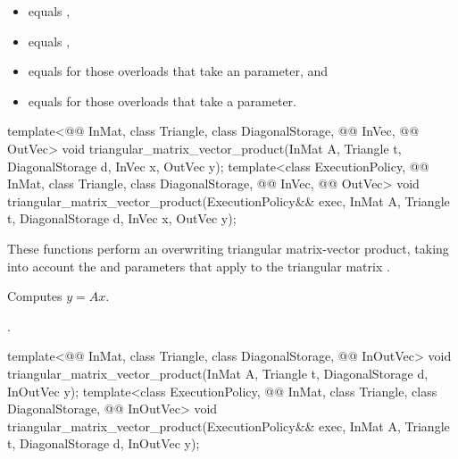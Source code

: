 \pnum
\expects
\begin{itemize}
\item
{} equals ,
\item
{} equals ,
\item
{} equals  for those overloads that take an  parameter, and
\item
{} equals  for those overloads that take a  parameter.
\end{itemize}

%
\begin{itemdecl}
template<@@ InMat, class Triangle, class DiagonalStorage, @@ InVec,
         @@ OutVec>
  void triangular_matrix_vector_product(InMat A, Triangle t, DiagonalStorage d, InVec x, OutVec y);
template<class ExecutionPolicy,
         @@ InMat, class Triangle, class DiagonalStorage, @@ InVec,
         @@ OutVec>
  void triangular_matrix_vector_product(ExecutionPolicy&& exec,
                                        InMat A, Triangle t, DiagonalStorage d, InVec x, OutVec y);
\end{itemdecl}

\begin{itemdescr}

\pnum
These functions perform
an overwriting triangular matrix-vector product,
taking into account the  and  parameters
that apply to the triangular matrix .

\pnum
\effects
Computes $y = A x$.

\pnum
\complexity
{}.
\end{itemdescr}

%
\begin{itemdecl}
template<@@ InMat, class Triangle, class DiagonalStorage, @@ InOutVec>
  void triangular_matrix_vector_product(InMat A, Triangle t, DiagonalStorage d, InOutVec y);
template<class ExecutionPolicy,
         @@ InMat, class Triangle, class DiagonalStorage, @@ InOutVec>
  void triangular_matrix_vector_product(ExecutionPolicy&& exec,
                                        InMat A, Triangle t, DiagonalStorage d, InOutVec y);
\end{itemdecl}

